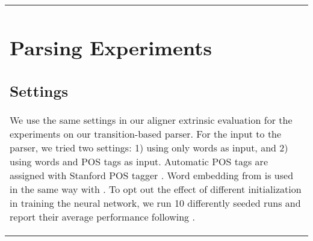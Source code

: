 \documentclass[11pt,a4paper]{article}
\begin{document}
\begin{table}[t]
\begin{tabular}{p{}}
\section{Parsing Experiments}\label{sec:parse-exp}

\subsection{Settings}
We use the same settings in our aligner extrinsic evaluation
for the experiments on our transition-based parser.
For the input to the parser, we tried two settings: 1) using only words as input,
and 2) using words and POS tags as input.
Automatic POS tags are assigned with Stanford POS tagger \cite{manning-EtAl:2014:P14-5}.
Word embedding from \citet{ling-EtAl:2015:NAACL-HLT} is used
in the same way with \citet{ballesteros-alonaizan:2017:EMNLP2017}.
To opt out the effect of different initialization in training the neural network,
we run 10 differently seeded runs and report their average performance following \citet{reimers-gurevych:2017:EMNLP2017}.


\end{tabular}
\end{table}
\end{document}

